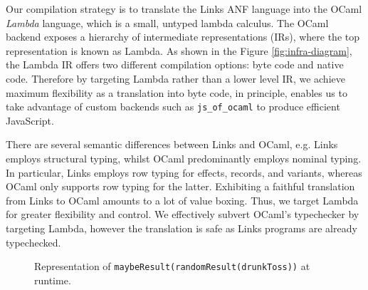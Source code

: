 \documentclass[mscres,cdtppar,twoside,openright,logo,rightchapter,normalheadings]{infthesis}
\theoremstyle{definition}
\begin{document}
%

Our compilation strategy is to translate the Links ANF language into the OCaml
\emph{Lambda} language, which is a small, untyped lambda calculus. The OCaml
backend exposes a hierarchy of intermediate representations (IRs), where the
top representation is known as Lambda. As shown in the Figure
\ref{fig:infra-diagram}, the Lambda IR offers two different compilation
options: byte code and native code. Therefore by targeting Lambda rather than
a lower level IR, we achieve maximum flexibility as a translation into byte
code, in principle, enables us to take advantage of custom backends such as
\texttt{js\_of\_ocaml} to produce efficient JavaScript.

%

There are several semantic differences between Links and OCaml, e.g. Links
employs structural typing, whilst OCaml predominantly employs nominal typing.
In particular, Links employs row typing for effects, records, and variants,
whereas OCaml only supports row typing for the latter. Exhibiting a faithful
translation from Links to OCaml amounts to a lot of value boxing. Thus, we
target Lambda for greater flexibility and control.  We effectively subvert
OCaml's typechecker by targeting Lambda, however the translation is safe as
Links programs are already typechecked.

\begin{figure}
\centering
{}
\caption{Representation of \lstinline$maybeResult(randomResult(drunkToss))$ at runtime.}\label{fig:rtstack}
\end{figure}
\end{document}
